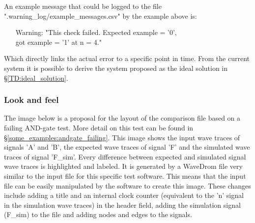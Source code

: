 An example message that could be logged to the file ".warning\_log/example\_messages.csv" by the example above is:
\begin{customenv}
	\label{log:error_message}
	\begin{itemize}
		\caption{Example error message}
		\centering
		\item [Warning:] "This check failed. Expected example = '0', \\
		got example = '1' at n = 4."
	\end{itemize}
\end{customenv}\nline
Which directly links the actual error to a specific point in time. From the current system it is possible to derive the system proposed as the ideal solution in §\ref{TD:ideal_solution}.\newpage
\subsubsection{Look and feel}
The image below is a proposal for the layout of the comparison file based on a failing AND-gate test. More detail on this test can be found in §\ref{some_examples:andgate_failing}.
\nline
This image shows the input wave traces of signals 'A' and 'B', the expected wave traces of signal 'F' and the simulated wave traces of signal 'F\_sim'. Every difference between expected and simulated signal wave traces is highlighted and labeled.
\npar
It is generated by a WaveDrom file very similar to the input file for this specific test software. This means that the input file can be easily manipulated by the software to create this image.
\npar
These changes include adding a title and an internal clock counter (equivalent to the 'n' signal in the simulation wave traces) in the header field, adding the simulation signal (F\_sim) to the file and adding nodes and edges to the signals.\newpage
